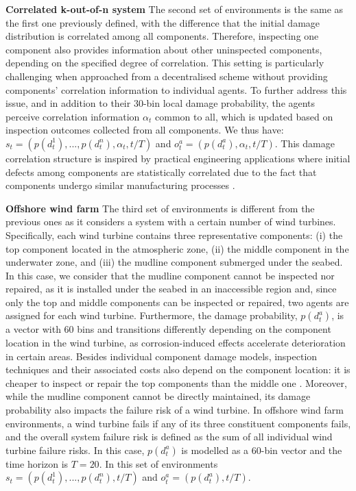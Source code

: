 \textbf{Correlated k-out-of-n system}
The second set of environments is the same as the first one previously defined, with the difference that the initial damage distribution is correlated among all components.
Therefore, inspecting one component also provides information about other uninspected components, depending on the specified degree of correlation.
This setting is particularly challenging when approached from a decentralised scheme without providing components' correlation information to individual agents.
To further address this issue, and in addition to their 30-bin local damage probability, the agents perceive correlation information $\alpha_t$ common to all, which is updated based on inspection outcomes collected from all components.
We thus have: $s_t = (p(d^1_t),..., p(d^n_t),\alpha_t, t/T)$ and $o^a_t=(p(d^a_t), \alpha_t, t/T)$.
This damage correlation structure is inspired by practical engineering applications where initial defects among components are statistically correlated due to the fact that components undergo similar manufacturing processes \citep{morato2022optimal}.

\textbf{Offshore wind farm}
The third set of environments is different from the previous ones as it considers a system with a certain number of wind turbines.
Specifically, each wind turbine contains three representative components: (i) the top component located in the atmospheric zone, (ii) the middle component in the underwater zone, and (iii) the mudline component submerged under the seabed.
In this case, we consider that the mudline component cannot be inspected nor repaired, as it is installed under the seabed in an inaccessible region and, since only the top and middle components can be inspected or repaired, two agents are assigned for each wind turbine.
Furthermore, the damage probability, $p(d^a_t)$, is a vector with 60 bins and transitions differently depending on the component location in the wind turbine, as corrosion-induced effects accelerate deterioration in certain areas. 
Besides individual component damage models, inspection techniques and their associated costs also depend on the component location: it is cheaper to inspect or repair the top components than the middle one \citep{giro2022inspection}.
Moreover, while the mudline component cannot be directly maintained, its damage probability also impacts the failure risk of a wind turbine.
In offshore wind farm environments, a wind turbine fails if any of its three constituent components fails, and the overall system failure risk is defined as the sum of all individual wind turbine failure risks. In this case, $p(d^a_t)$ is modelled as a 60-bin vector and the time horizon is $T=20$.
In this set of environments $s_t = (p(d^1_t),..., p(d^n_t), t/T)$ and $o^a_t=(p(d^a_t), t/T)$.

